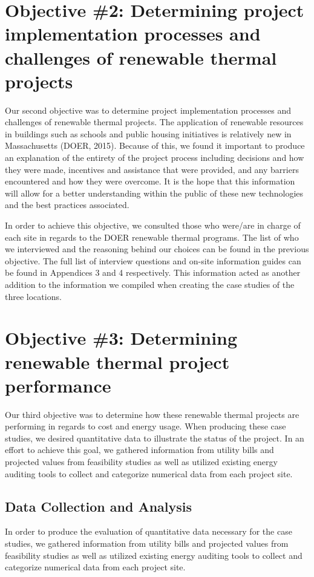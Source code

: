   \section{Objective \#2: Determining project implementation processes and challenges of renewable thermal projects}
  \par Our second objective was to determine project implementation processes and challenges of renewable thermal projects. The application of renewable resources in buildings such as schools and public housing initiatives is relatively new in Massachusetts (DOER, 2015). Because of this, we found it important to produce an explanation of the entirety of the project process including decisions and how they were made, incentives and assistance that were provided, and any barriers encountered and how they were overcome. It is the hope that this information will allow for a better understanding within the public of these new technologies and the best practices associated.
  \par In order to achieve this objective, we consulted those who were/are in charge of each site in regards to the DOER renewable thermal programs. The list of who we interviewed and the reasoning behind our choices can be found in the previous objective. The full list of interview questions and on-site information guides can be found in Appendices 3 and 4 respectively. This information acted as another addition to the information we compiled when creating the case studies of the three locations.

  \section{Objective \#3: Determining renewable thermal project performance }
  \par Our third objective was to determine how these renewable thermal projects are performing in regards to cost and energy usage. When producing these case studies, we desired quantitative data to illustrate the status of the project. In an effort to achieve this goal, we gathered information from utility bills and projected values from feasibility studies as well as utilized existing energy auditing tools to collect and categorize numerical data from each project site.  

    \subsection{Data Collection and Analysis}
    \par In order to produce the evaluation of quantitative data necessary for the case studies, we gathered information from utility bills and projected values from feasibility studies as well as utilized existing energy auditing tools to collect and categorize numerical data from each project site. 
 
